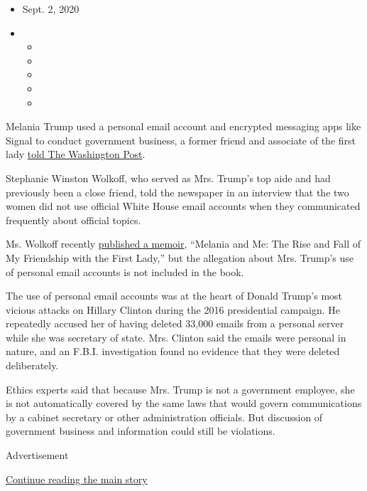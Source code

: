\begin{itemize}
\item
  Sept. 2, 2020
\item
  \begin{itemize}
  \item
  \item
  \item
  \item
  \item
  \end{itemize}
\end{itemize}

Melania Trump used a personal email account and encrypted messaging apps
like Signal to conduct government business, a former friend and
associate of the first lady
\href{https://www.washingtonpost.com/lifestyle/style/melania-trump-used-private-email-accounts-while-in-the-white-house-says-former-colleague-and-friend/2020/09/01/3f678ae2-eb3c-11ea-99a1-71343d03bc29_story.html}{told
The Washington Post}.

Stephanie Winston Wolkoff, who served as Mrs. Trump's top aide and had
previously been a close friend, told the newspaper in an interview that
the two women did not use official White House email accounts when they
communicated frequently about official topics.

Ms. Wolkoff recently
\href{https://www.nytimes3xbfgragh.onion/2020/08/28/books/review/melania-and-me-stephanie-winston-wolkoff.html}{published
a memoir}, ``Melania and Me: The Rise and Fall of My Friendship with the
First Lady,'' but the allegation about Mrs. Trump's use of personal
email accounts is not included in the book.

The use of personal email accounts was at the heart of Donald Trump's
most vicious attacks on Hillary Clinton during the 2016 presidential
campaign. He repeatedly accused her of having deleted 33,000 emails from
a personal server while she was secretary of state. Mrs. Clinton said
the emails were personal in nature, and an F.B.I. investigation found no
evidence that they were deleted deliberately.

Ethics experts said that because Mrs. Trump is not a government
employee, she is not automatically covered by the same laws that would
govern communications by a cabinet secretary or other administration
officials. But discussion of government business and information could
still be violations.

Advertisement

\protect\hyperlink{after-bottom}{Continue reading the main story}

